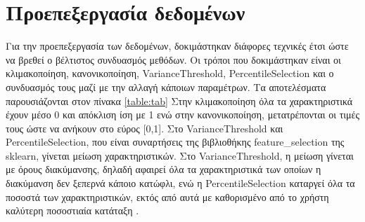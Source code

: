 \section{Προεπεξεργασία δεδομένων}
Για την προεπεξεργασία των δεδομένων, δοκιμάστηκαν διάφορες τεχνικές έτσι ώστε να βρεθεί ο βέλτιστος συνδυασμός μεθόδων. Οι τρόποι που δοκιμάστηκαν είναι οι κλιμακοποίηση, κανονικοποίηση, VarianceThreshold, PercentileSelection και ο συνδυασμός τους μαζί με την αλλαγή κάποιων παραμέτρων. Τα αποτελέσματα παρουσιάζονται στον πίνακα \ref{table:tab}
Στην κλιμακοποίηση όλα τα χαρακτηριστικά έχουν μέσο 0 και απόκλιση ίση με 1 ενώ στην κανονικοποίηση, μετατρέπονται οι τιμές τους ώστε να ανήκουν στο εύρος [0,1].  Στο VarianceThreshold και PercentileSelection, που είναι συναρτήσεις της βιβλιοθήκης feature\_selection της sklearn, γίνεται μείωση χαρακτηριστικών. Στο VarianceThreshold, η μείωση γίνεται με όρους διακύμανσης, δηλαδή
αφαιρεί όλα τα χαρακτηριστικά των οποίων η διακύμανση δεν ξεπερνά κάποιο κατώφλι, ενώ η PercentileSelection καταργεί όλα τα ποσοστά των χαρακτηριστικών, εκτός από αυτά με καθορισμένο από το χρήστη καλύτερη ποσοστιαία κατάταξη . %

